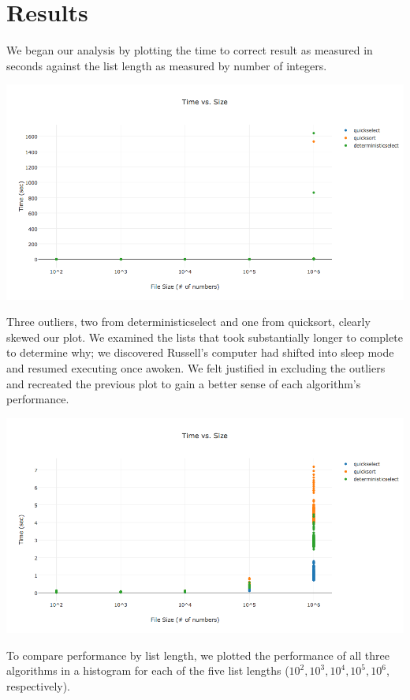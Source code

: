 \documentclass{article}
\begin{document}
\section*{Results}

\indent \indent We began our analysis by plotting the time to correct result as measured in seconds against the list length as measured by number of integers.

\includegraphics[scale=0.45]{resultsWoutliers}

Three outliers, two from deterministicselect and one from quicksort, clearly skewed our plot. We examined the lists that took substantially longer to complete to determine why; we discovered Russell's computer had shifted into sleep mode and resumed executing once awoken. We felt justified in excluding the outliers and recreated the previous plot to gain a better sense of each algorithm's performance.

\includegraphics[scale=.45]{results}

To compare performance by list length, we plotted the performance of all three algorithms in a histogram for each of the five list lengths ($10^2, 10^3, 10^4, 10^5, 10^6$, respectively).
\end{document}
